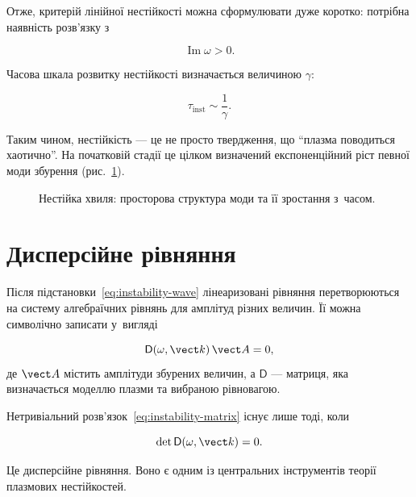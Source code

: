 Отже, критерій лінійної нестійкості можна сформулювати дуже коротко:
потрібна наявність розв'язку з

\begin{equation}
\operatorname{Im}\omega>0.
\label{eq:instability-growth-condition}
\end{equation}

Часова шкала розвитку нестійкості визначається величиною $\gamma$:

\begin{equation}
\tau_\mathrm{inst}\sim\frac{1}{\gamma}.
\label{eq:instability-time}
\end{equation}

Таким чином, нестійкість --- це не просто твердження, що
\enquote{плазма поводиться хаотично}. На початковій стадії це цілком
визначений експоненційний ріст певної моди збурення (рис.~\ref{fig:instability-growing-mode}).

\begin{figure}[ht]
\centering
{}
\caption{Нестійка хвиля: просторова структура моди та її зростання
з~часом.}
\label{fig:instability-growing-mode}
\end{figure}

\section{Дисперсійне рівняння}

Після підстановки~\eqref{eq:instability-wave} лінеаризовані рівняння
перетворюються на систему алгебраїчних рівнянь для амплітуд різних
величин. Її можна символічно записати у~вигляді

\begin{equation}
\mathsf{D}(\omega,\vect k)\,\vect A=0,
\label{eq:instability-matrix}
\end{equation}
%
де $\vect A$ містить амплітуди збурених величин, а
$\mathsf{D}$ --- матриця, яка визначається моделлю плазми та вибраною
рівновагою.

Нетривіальний розв'язок~\eqref{eq:instability-matrix} існує лише тоді,
коли

\begin{equation}
\det\mathsf{D}(\omega,\vect k)=0.
\label{eq:instability-dispersion}
\end{equation}

Це дисперсійне рівняння. Воно є одним із центральних інструментів
теорії плазмових нестійкостей.

